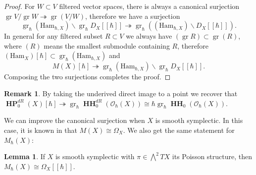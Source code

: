 \documentclass[draft]{article}
\theoremstyle{definition}
\newtheorem{lemma}[theorem]{Lemma}
\newtheorem{remark}[theorem]{Remark}
\DeclareMathOperator{\gr}{gr}
\DeclareMathOperator{\HH}{\mathbf{HH}}
\DeclareMathOperator{\HP}{\mathbf{HP}}
\newcommand{\doubleh}{[\![ \hbar ]\!]}
\newcommand{\MhX}{M_\hbar(X)}
\begin{document}
\begin{proof}
For $W\subset V$ filtered vector spaces, there is always a canonical surjection $\gr V/\gr W \twoheadrightarrow \gr(V/W)$, therefore we have a surjection  $$\gr_\hbar(\text{Ham}_{\hbar,X})\backslash \gr_\hbar D_X\doubleh \twoheadrightarrow\gr_\hbar ((\text{Ham}_{\hbar,X})\backslash D_X\doubleh).$$ In general for any filtered subset $R\subset V$ we always have $(\gr R)\subset \gr( R )$, where $(R )$ means the smallest submodule containing $R$, therefore $(\text{Ham}_X)[\hbar]\subset\gr_\hbar(\text{Ham}_{\hbar,X})$ and $$M(X)[\hbar]\twoheadrightarrow  \gr_\hbar(\text{Ham}_{\hbar,X})\backslash\gr_\hbar D_X\doubleh.$$ Composing the two surjections completes the proof. 
\end{proof}

\begin{remark}
By taking the underived direct image to a point we recover that $\HP^{dR}_0(X)[\hbar]\twoheadrightarrow \gr_\hbar \HH^{dR}_0(\mathcal{O}_\hbar(X))\cong \hbar\gr_\hbar \HH_0(\mathcal{O}_\hbar(X))$.
\end{remark}

We can improve the canonical surjection when $X$ is smooth symplectic. In this case, it is known in \cite[Example 2.6]{Poisson_Traces_and_D-Modules_on_Poisson_Varieties} that $M(X)\cong \Omega_X$. We also get the same statement for $\MhX$:

\begin{lemma}
If $X$ is smooth symplectic with $\pi\in \bigwedge^2TX$ its Poisson structure, then $M_\hbar(X)\cong \Omega_X\doubleh$.
\end{lemma}
\end{document}
